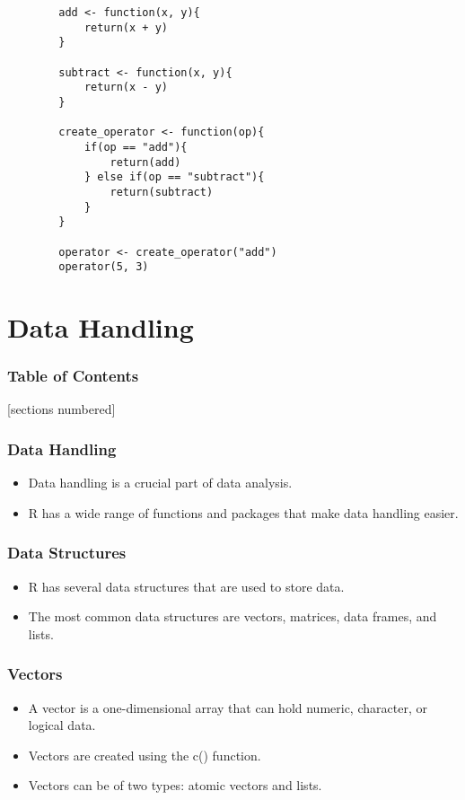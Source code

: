 \documentclass[serif, 9pt, aspectratio=32]{beamer}
\begin{document}
\begin{frame}[fragile]
    \begin{lstlisting}
        add <- function(x, y){
            return(x + y)
        }

        subtract <- function(x, y){
            return(x - y)
        }

        create_operator <- function(op){
            if(op == "add"){
                return(add)
            } else if(op == "subtract"){
                return(subtract)
            }
        }

        operator <- create_operator("add")
        operator(5, 3)
    \end{lstlisting}
\end{frame}

\section{Data Handling}

\begin{frame}
    \frametitle{Table of Contents}
    [sections numbered]
    \tableofcontents[currentsection]
\end{frame}

\begin{frame}
    \centering
    \frametitle{Data Handling}
    \begin{itemize}
        \setlength{\itemsep}{2em}
        \item Data handling is a crucial part of data analysis.
        \item R has a wide range of functions and packages that make data handling easier.
    \end{itemize}
\end{frame}

\begin{frame}
    \centering
    \frametitle{Data Structures}
    \begin{itemize}
        \setlength{\itemsep}{2em}
        \item R has several data structures that are used to store data.
        \item The most common data structures are vectors, matrices, data frames, and lists.
    \end{itemize}
\end{frame}

\begin{frame}
    \centering
    \frametitle{Vectors}
    \begin{itemize}
        \setlength{\itemsep}{2em}
        \item A vector is a one-dimensional array that can hold numeric, character, or logical data.
        \item Vectors are created using the c() function.
        \item Vectors can be of two types: atomic vectors and lists.
    \end{itemize}
\end{frame}
\end{document}

